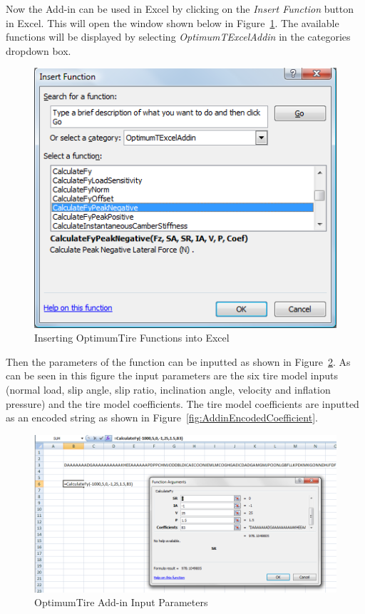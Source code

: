 Now the Add-in can be used in Excel by clicking on the \textit{Insert Function} button in Excel. This will open the window shown below in Figure~\ref{fig:InsertFunction}. The available functions will be displayed by selecting \textit{OptimumTExcelAddin} in the categories dropdown box.

\begin{figure}[H]
	\centering
		\includegraphics[width=.8\textwidth]{InsertFunction.png}
	\caption{Inserting OptimumTire Functions into Excel}
	\label{fig:InsertFunction}
\end{figure}

Then the parameters of the function can be inputted as shown in Figure~\ref{fig:AddinResults}. As can be seen in this figure the input parameters are the six tire model inputs (normal load, slip angle, slip ratio, inclination angle, velocity and inflation pressure) and the tire model coefficients. The tire model coefficients are inputted as an encoded string as shown in Figure~\ref{fig:AddinEncodedCoefficient}.

\begin{figure}[H]
	\centering
		\includegraphics[width=1.0\textwidth]{AddinResults.png}
	\caption{OptimumTire Add-in Input Parameters}
	\label{fig:AddinResults}
\end{figure}

